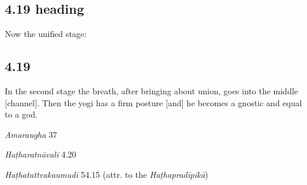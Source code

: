 \begin{ekdosis}

\subsection*{4.19 heading}
\begin{translation}[hp04_019a]
Now the unified stage:
\end{translation}


\subsection*{4.19}
\begin{translation}[hp04_019]
In the second stage the breath, after bringing about union, goes into the middle [channel]. Then the yogi has a firm posture [and] he becomes a gnostic and equal to a god.
\end{translation}


\begin{sources}[hp04_019]
\emph{Amaraugha} 37
\begin{versinnote}
\tl{\var{dvitīye saṅ- ] \emph{Amaraugha} : dvitīyāyāṃ \emph{Amaraughaprabodha}}\\!}
\end{versinnote}
\end{sources}

\begin{testimonia}[hp04_019]
\emph{Haṭharatnāvalī} 4.20
\begin{versinnote}
\end{versinnote}

\emph{Haṭhatattvakaumudī} 54.15 (attr. to the \emph{Haṭhapradīpikā})
\begin{versinnote}
\end{versinnote}
\end{testimonia}


\end{ekdosis}
